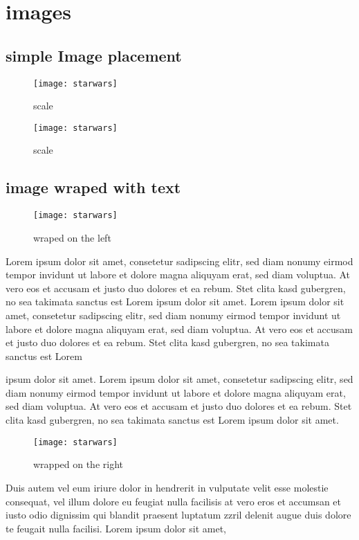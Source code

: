\chapter{images}
\section{simple Image placement}
\begin{figure}[h]
	\centering
	\texttt{[image: starwars]}
	\caption{scale}
\end{figure}

\begin{figure}[h]
	\centering
	\texttt{[image: starwars]}
	\caption{scale}
\end{figure}

\section{image wraped with text}
\begin{wrapfigure}{r}{0.3\textwidth} %
	\centering
	\texttt{[image: starwars]}
	\caption{wraped on the left}
\end{wrapfigure}

Lorem ipsum dolor sit amet, consetetur sadipscing elitr, sed diam nonumy eirmod tempor invidunt ut labore et dolore magna aliquyam erat, sed diam voluptua. At vero eos et accusam et justo duo dolores et ea rebum. Stet clita kasd gubergren, no sea takimata sanctus est Lorem ipsum dolor sit amet. Lorem ipsum dolor sit amet, consetetur sadipscing elitr, sed diam nonumy eirmod tempor invidunt ut labore et dolore magna aliquyam erat, sed diam voluptua. At vero eos et accusam et justo duo dolores et ea rebum. Stet clita kasd gubergren, no sea takimata sanctus est Lorem \par ipsum dolor sit amet. Lorem ipsum dolor sit amet, consetetur sadipscing elitr, sed diam nonumy eirmod tempor invidunt ut labore et dolore magna aliquyam erat, sed diam voluptua. At vero eos et accusam et justo duo dolores et ea rebum. Stet clita kasd gubergren, no sea takimata sanctus est Lorem ipsum dolor sit amet. 

\begin{wrapfigure}{l}{0.5\textwidth} %
	\centering
	\texttt{[image: starwars]}
	\caption{wrapped on the right}
\end{wrapfigure}

Duis autem vel eum iriure dolor in hendrerit in vulputate velit esse molestie consequat, vel illum dolore eu feugiat nulla facilisis at vero eros et accumsan et iusto odio dignissim qui blandit praesent luptatum zzril delenit augue duis dolore te feugait nulla facilisi. Lorem ipsum dolor sit amet,
